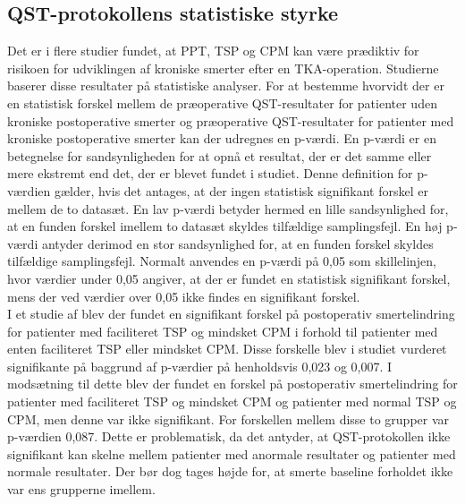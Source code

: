\subsection{QST-protokollens statistiske styrke}
Det er i flere studier fundet, at PPT, TSP og CPM kan være prædiktiv for risikoen for udviklingen af kroniske smerter efter en TKA-operation. \citep{Petersen2015} \citep{Petersen2016} \citep{Wylde2016c} Studierne baserer disse resultater på statistiske analyser. For at bestemme hvorvidt der er en statistisk forskel mellem de præoperative QST-resultater for patienter uden kroniske postoperative smerter og præoperative QST-resultater for patienter med kroniske postoperative smerter kan der udregnes en p-værdi. En p-værdi er en betegnelse for sandsynligheden for at opnå et resultat, der er det samme eller mere ekstremt end det, der er blevet fundet i studiet. Denne definition for p-værdien gælder, hvis det antages, at der ingen statistisk signifikant forskel er mellem de to datasæt. En lav p-værdi betyder hermed en lille sandsynlighed for, at en funden forskel imellem to datasæt skyldes tilfældige samplingsfejl. En høj p-værdi antyder derimod en stor sandsynlighed for, at en funden forskel skyldes tilfældige samplingsfejl. Normalt anvendes en p-værdi på 0,05 som skillelinjen, hvor værdier under 0,05 angiver, at der er fundet en statistisk signifikant forskel, mens der ved værdier over 0,05 ikke findes en signifikant forskel. \citep{Zar2010} \\
I et studie af  blev der fundet en signifikant forskel på postoperativ smertelindring for patienter med faciliteret TSP og mindsket CPM i forhold til patienter med enten faciliteret TSP eller mindsket CPM. Disse forskelle blev i studiet vurderet signifikante på baggrund af p-værdier på henholdsvis 0,023 og 0,007. I modsætning til dette blev der fundet en forskel på postoperativ smertelindring for patienter med faciliteret TSP og mindsket CPM og patienter med normal TSP og CPM, men denne var ikke signifikant. For forskellen mellem disse to grupper var p-værdien 0,087. \citep{Petersen2016} Dette er problematisk, da det antyder, at QST-protokollen ikke signifikant kan skelne mellem patienter med anormale resultater og patienter med normale resultater. Der bør dog tages højde for, at smerte baseline forholdet ikke var ens grupperne imellem. \\ %
